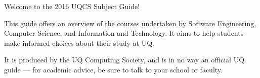 Welcome to the 2016 UQCS Subject Guide!

This guide offers an overview of the courses undertaken by Software Engineering, Computer Science, and Information and Technology.
It aims to help students make informed choices about their study at UQ.

It is produced by the UQ Computing Society, and is in no way an official UQ guide --- for academic advice, be sure to talk to your school or faculty.
